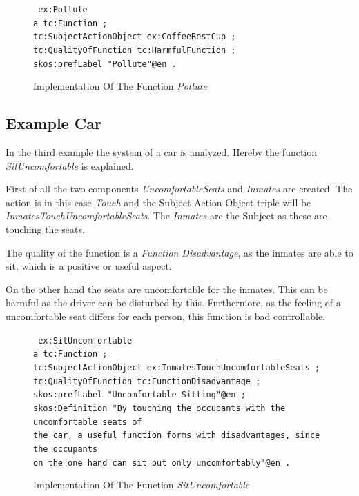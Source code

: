 \begin{figure}[H]
    \centering
    \begin{code}\tt
        ex:Pollute\\
        \> a tc:Function ;\\
        \> tc:SubjectActionObject ex:CoffeeRestCup ;\\
        \> tc:QualityOfFunction tc:HarmfulFunction ;\\
        \> skos:prefLabel "Pollute"@en .\\
    \end{code}
    \caption{Implementation Of The Function \textit{Pollute}}
    \label{fig:implementation_function_pollute}
\end{figure}

\subsection{Example Car}

In the third example the system of a car is analyzed.
Hereby the function \textit{SitUncomfortable} is explained.

First of all the two components \textit{UncomfortableSeats} and \textit{Inmates} are created.
The action is in this case \textit{Touch} and the Subject-Action-Object triple will be \textit{InmatesTouchUncomfortableSeats}.
The \textit{Inmates} are the Subject as these are touching the seats.

The quality of the function is a \textit{Function Disadvantage}, as the inmates are able to sit, which is a positive or useful aspect. 

On the other hand the seats are uncomfortable for the inmates.
This can be harmful as the driver can be disturbed by this. 
Furthermore, as the feeling of a uncomfortable seat differs for each person, this function is bad controllable.
\begin{figure}[H]
    \centering
    \begin{code}\tt
        ex:SitUncomfortable\\
        \> a tc:Function ;\\
        \> tc:SubjectActionObject ex:InmatesTouchUncomfortableSeats ;\\
        \> tc:QualityOfFunction tc:FunctionDisadvantage ;\\
        \> skos:prefLabel "Uncomfortable Sitting"@en ;\\
        \> skos:Definition "By touching the occupants with the uncomfortable seats of\\
        \> \> the car, a useful function forms with disadvantages, since the occupants\\
        \> \> on the one hand can sit but only uncomfortably"@en .
    \end{code}
    \caption{Implementation Of The Function \textit{SitUncomfortable}}
    \label{fig:implementation_function_sit_uncomfortable}
\end{figure}


